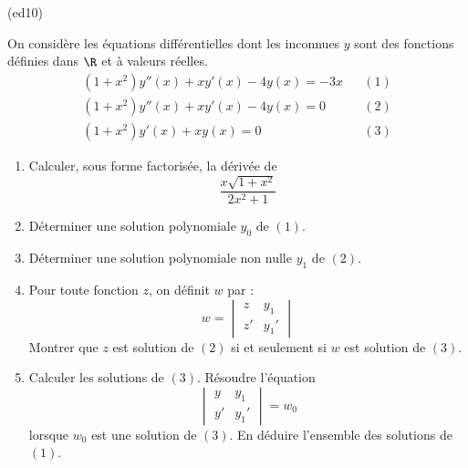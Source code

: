\begin{tiny}(ed10)\end{tiny}
On considère les équations différentielles dont les inconnues $y$ sont des fonctions définies dans $\R$ et à valeurs réelles.
\begin{align*}
 (1+x^2)y''(x)+xy'(x)-4y(x) = -3x & &(1)\\
 (1+x^2)y''(x)+xy'(x)-4y(x) = 0 & &(2)\\
(1+x^2)y'(x)+xy(x) = 0 & &(3)
\end{align*}
\begin{enumerate}
\item Calculer, sous forme factorisée,  la dérivée de
\begin{displaymath}
 \frac{x\sqrt{1+x^2}}{2x^2+1}
\end{displaymath}

\item Déterminer une solution polynomiale $y_0$ de $(1)$.
\item Déterminer une solution polynomiale non nulle $y_1$ de $(2)$.
\item Pour toute fonction $z$, on définit $w$ par :
\begin{displaymath}
 w=\begin{vmatrix}
    z & y_1\\
z' & y_1'
   \end{vmatrix}
\end{displaymath}
Montrer que $z$ est solution de $(2)$ si et seulement si $w$ est solution de $(3)$.
\item Calculer les solutions de $(3)$. Résoudre l'équation
\begin{displaymath}
 \begin{vmatrix}
y & y_1\\
y' & y_1'
 \end{vmatrix} = w_0
\end{displaymath}
lorsque $w_0$ est une solution de $(3)$.
En déduire l'ensemble des solutions de $(1)$.
\end{enumerate}